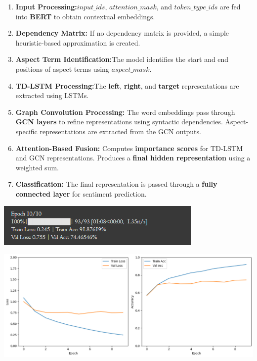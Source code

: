 \documentclass{article}
\begin{document}
\begin{enumerate}
    \item \textbf{Input Processing:}$input\_ids$, $attention\_mask$, and $token\_type\_ids$ are fed into \textbf{BERT} to obtain contextual embeddings.
    \item \textbf{Dependency Matrix:} If no dependency matrix is provided, a simple heuristic-based approximation is created.
    \item \textbf{Aspect Term Identification:}The model identifies the start and end positions of aspect terms using $aspect\_mask$.
    \item \textbf{TD-LSTM Processing:}The \textbf{left}, \textbf{right}, and \textbf{target} representations are extracted using LSTMs.
    \item \textbf{Graph Convolution Processing:}
     The word embeddings pass through \textbf{GCN layers} to refine representations using syntactic dependencies. Aspect-specific representations are extracted from the GCN outputs.

    \item \textbf{Attention-Based Fusion:} Computes \textbf{importance scores} for TD-LSTM and GCN representations. Produces a \textbf{final hidden representation} using a weighted sum.
    \item \textbf{Classification:} The final representation is passed through a \textbf{fully connected layer} for sentiment prediction.
\end{enumerate}
\begin{center}
\includegraphics[width=0.75\textwidth]{Model_3_Accuracy.png}
\end{center}
\begin{center}
\includegraphics[width=1\textwidth]{Architecture 3.png}
\end{center}
\end{document}
